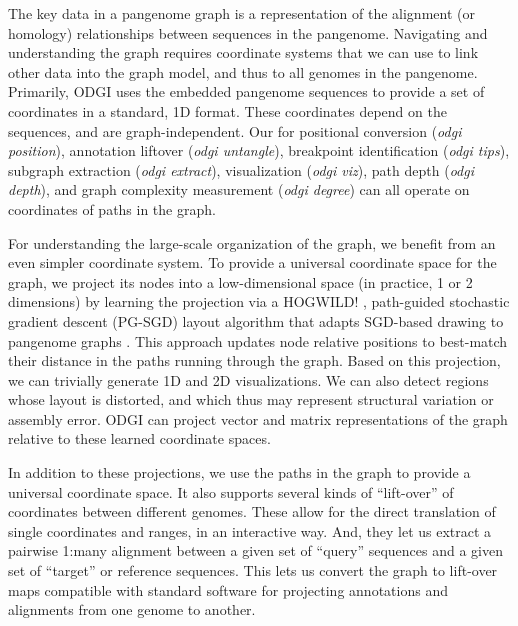 \documentclass{bioinfo}
\begin{document}
The key data in a pangenome graph is a representation of the alignment (or homology) relationships between sequences in the pangenome.
Navigating and understanding the graph requires coordinate systems that we can use to link other data into the graph model, and thus to all genomes in the pangenome.
Primarily, ODGI uses the embedded pangenome sequences to provide a set of coordinates in a standard, 1D format.	
These coordinates depend on the sequences, and are graph-independent.
Our for positional conversion (\textit{odgi position}), annotation liftover (\textit{odgi untangle}), breakpoint identification (\textit{odgi tips}), subgraph extraction (\textit{odgi extract}), visualization (\textit{odgi viz}), path depth (\textit{odgi depth}), and graph complexity measurement (\textit{odgi degree}) can all operate on coordinates of paths in the graph.

For understanding the large-scale organization of the graph, we benefit from an even simpler coordinate system.
To provide a universal coordinate space for the graph, we project its nodes into a low-dimensional space (in practice, 1 or 2 dimensions) by learning the projection via a HOGWILD! \citep{niu2011hogwild}, path-guided stochastic gradient descent (PG-SGD) layout algorithm that adapts SGD-based drawing to pangenome graphs \citep{zheng2018graph}.
This approach updates node relative positions to best-match their distance in the paths running through the graph.
Based on this projection, we can trivially generate 1D and 2D visualizations.
We can also detect regions whose layout is distorted, and which thus may represent structural variation or assembly error.
ODGI can project vector and matrix representations of the graph relative to these learned coordinate spaces.

In addition to these projections, we use the paths in the graph to provide a universal coordinate space.
It also supports several kinds of ``lift-over'' of coordinates between different genomes.
These allow for the direct translation of single coordinates and ranges, in an interactive way.
And, they let us extract a pairwise 1:many alignment between a given set of ``query'' sequences and a given set of ``target'' or reference sequences.
This lets us convert the graph to lift-over maps compatible with standard software for projecting annotations and alignments from one genome to another.



\end{document}

